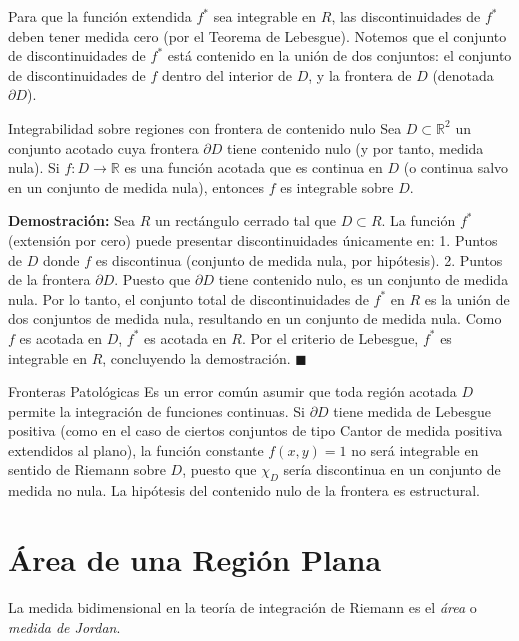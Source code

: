 \documentclass[11pt,a4paper]{article}
\begin{document}
Para que la función extendida $f^*$ sea integrable en $R$, las discontinuidades de $f^*$ deben tener medida cero (por el Teorema de Lebesgue). Notemos que el conjunto de discontinuidades de $f^*$ está contenido en la unión de dos conjuntos: el conjunto de discontinuidades de $f$ dentro del interior de $D$, y la frontera de $D$ (denotada $\partial D$).

\begin{teoremabox}{Integrabilidad sobre regiones con frontera de contenido nulo}{}
    Sea $D \subset \mathbb{R}^2$ un conjunto acotado cuya frontera $\partial D$ tiene contenido nulo (y por tanto, medida nula). Si $f: D \to \mathbb{R}$ es una función acotada que es continua en $D$ (o continua salvo en un conjunto de medida nula), entonces $f$ es integrable sobre $D$.
\end{teoremabox}

\textbf{Demostración:}
Sea $R$ un rectángulo cerrado tal que $D \subset R$. La función $f^*$ (extensión por cero) puede presentar discontinuidades únicamente en:
1. Puntos de $D$ donde $f$ es discontinua (conjunto de medida nula, por hipótesis).
2. Puntos de la frontera $\partial D$.
Puesto que $\partial D$ tiene contenido nulo, es un conjunto de medida nula. Por lo tanto, el conjunto total de discontinuidades de $f^*$ en $R$ es la unión de dos conjuntos de medida nula, resultando en un conjunto de medida nula. Como $f$ es acotada en $D$, $f^*$ es acotada en $R$. Por el criterio de Lebesgue, $f^*$ es integrable en $R$, concluyendo la demostración. $\blacksquare$

\begin{errorbox}{Fronteras Patológicas}
    Es un error común asumir que toda región acotada $D$ permite la integración de funciones continuas. Si $\partial D$ tiene medida de Lebesgue positiva (como en el caso de ciertos conjuntos de tipo Cantor de medida positiva extendidos al plano), la función constante $f(x,y) = 1$ no será integrable en sentido de Riemann sobre $D$, puesto que $\chi_D$ sería discontinua en un conjunto de medida no nula. La hipótesis del contenido nulo de la frontera es estructural.
\end{errorbox}

\section{Área de una Región Plana}

La medida bidimensional en la teoría de integración de Riemann es el \textit{área} o \textit{medida de Jordan}.
\end{document}
